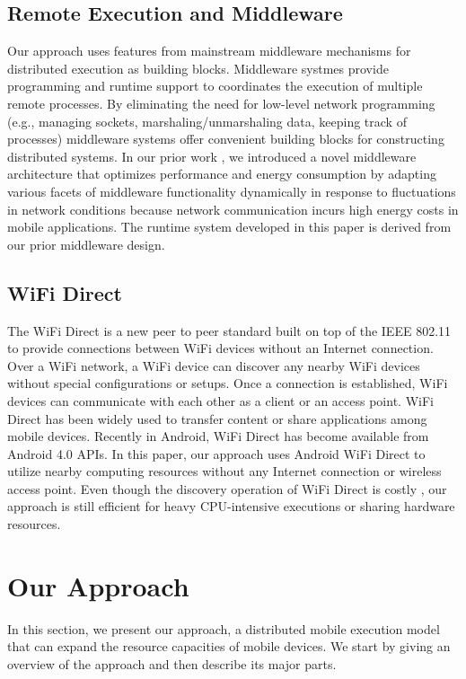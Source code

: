 \documentclass{sig-alternate}[10pt]
\begin{document}
\subsection{Remote Execution and Middleware}
Our approach uses features from mainstream middleware mechanisms for distributed execution as building blocks. Middleware systmes provide programming and runtime support to coordinates the execution of multiple remote processes. By eliminating the need for low-level network programming (e.g., managing sockets, marshaling/unmarshaling data, keeping track of processes) middleware systems offer convenient building blocks for constructing distributed systems. In our prior work \cite{kwon+:mobicase14-middleware}, we introduced a novel middleware architecture that optimizes performance and energy consumption by adapting various facets of middleware functionality dynamically in response to fluctuations in network conditions because network communication incurs high energy costs in mobile applications. The runtime system developed in this paper is derived from our prior middleware design.

\subsection{WiFi Direct}
The WiFi Direct \cite{alliance2010wi} is a new peer to peer standard built on top of the IEEE 802.11 to provide connections between WiFi devices without an Internet connection. Over a WiFi network, a WiFi device can discover any nearby WiFi devices without special configurations or setups. Once a connection is established, WiFi devices can communicate with each other as a client or an access point. WiFi Direct has been widely used to transfer content or share applications among mobile devices. Recently in Android, WiFi Direct has become available from Android 4.0 APIs. In this paper, our approach uses Android WiFi Direct \cite{wifi:p2p} to utilize nearby computing resources without any Internet connection or wireless access point. Even though the discovery operation of WiFi Direct is costly \cite{trifunovic2013slicing}, our approach is still efficient for heavy CPU-intensive executions or sharing hardware resources. 



\section{Our Approach}
\label{sec:approach}
In this section, we present our approach, a distributed mobile execution model that can expand the resource capacities of mobile devices. We start by giving an overview of the approach and then describe its major parts.
\end{document}
